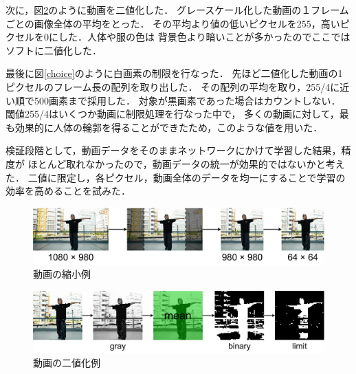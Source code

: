 次に，図\ref{binary}のように動画を二値化した．
グレースケール化した動画の１フレームごとの画像全体の平均をとった．
その平均より値の低いピクセルを255，高いピクセルを0にした．人体や服の色は
背景色より暗いことが多かったのでここではソフトに二値化した．

最後に図\ref{choice}のように白画素の制限を行なった．
先ほど二値化した動画の1ピクセルのフレーム長の配列を取り出した．
その配列の平均を取り，255/4に近い順で500画素まで採用した．
対象が黒画素であった場合はカウントしない．
閾値255/4はいくつか動画に制限処理を行なった中で，
多くの動画に対して，最も効果的に人体の輪郭を得ることができたため，このような値を用いた．

検証段階として，動画データをそのままネットワークにかけて学習した結果，精度が
ほとんど取れなかったので，動画データの統一が効果的ではないかと考えた．
二値に限定し，各ピクセル，動画全体のデータを均一にすることで学習の効率を高めることを試みた．

\begin{figure}[b]
  \begin{center}
    \includegraphics[width=120mm]{images/chart/resize.pdf}
  \end{center}
  \caption{動画の縮小例}
  \label{resize}
\end{figure}

\begin{figure}[b]
  \begin{center}
    \includegraphics[width=120mm]{images/chart/binary.pdf}
  \end{center}
  \caption{動画の二値化例}
  \label{binary}
\end{figure}
\clearpage

